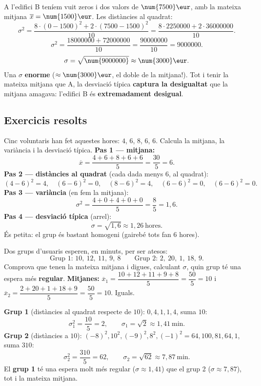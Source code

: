\begin{exemple}
A l'edifici B teníem vuit zeros i dos valors de $\num{7500}\eur$, amb la mateixa
mitjana $\overline{x}=\num{1500}\eur$. Les distàncies al quadrat:
\[
\sigma^2=\frac{8\cdot(0-\num{1500})^2+2\cdot(\num{7500}-\num{1500})^2}{10}
=\frac{8\cdot\num{2250000}+2\cdot\num{36000000}}{10}.
\]
\[
\sigma^2=\frac{\num{18000000}+\num{72000000}}{10}=\frac{\num{90000000}}{10}=\num{9000000}.
\]
\[
\sigma=\sqrt{\num{9000000}}\approx \num{3000}\eur.
\]
Una $\sigma$ \textbf{enorme} ($\approx\num{3000}\eur$, el doble de la mitjana!). Tot i
tenir la mateixa mitjana que A, la desviació típica \textbf{captura la desigualtat}
que la mitjana amagava: l'edifici B és \textbf{extremadament desigual}.
\end{exemple}

\subsection{Exercicis resolts}

\begin{exresolt}
Cinc voluntaris han fet aquestes hores: $4$, $6$, $8$, $6$, $6$. Calcula la mitjana,
la variància i la desviació típica.
\solucio
\textbf{Pas 1 — mitjana:}
\[
\overline{x}=\frac{4+6+8+6+6}{5}=\frac{30}{5}=6.
\]
\textbf{Pas 2 — distàncies al quadrat} (cada dada menys $6$, al quadrat):
\[
(4-6)^2=4,\quad (6-6)^2=0,\quad (8-6)^2=4,\quad (6-6)^2=0,\quad (6-6)^2=0.
\]
\textbf{Pas 3 — variància} (en fem la mitjana):
\[
\sigma^2=\frac{4+0+4+0+0}{5}=\frac{8}{5}=1,6.
\]
\textbf{Pas 4 — desviació típica} (arrel):
\[
\sigma=\sqrt{1,6}\approx 1,26\ \text{hores}.
\]
És petita: el grup és bastant homogeni (gairebé tots fan $6$ hores).
\end{exresolt}

\begin{exresolt}
Dos grups d'usuaris esperen, en minuts, per ser atesos:
\[
\text{Grup 1: } 10,\ 12,\ 11,\ 9,\ 8 \qquad
\text{Grup 2: } 2,\ 20,\ 1,\ 18,\ 9.
\]
Comprova que tenen la mateixa mitjana i digues, calculant $\sigma$, quin grup té una
espera més \textbf{regular}.
\solucio
\textbf{Mitjanes:} $\overline{x}_1=\dfrac{10+12+11+9+8}{5}=\dfrac{50}{5}=10$ i
$\overline{x}_2=\dfrac{2+20+1+18+9}{5}=\dfrac{50}{5}=10$. Iguals.

\textbf{Grup 1} (distàncies al quadrat respecte de $10$): $0,4,1,1,4$, suma $10$:
\[
\sigma_1^2=\frac{10}{5}=2,\qquad \sigma_1=\sqrt{2}\approx 1,41\ \text{min}.
\]
\textbf{Grup 2} (distàncies a $10$): $(-8)^2,10^2,(-9)^2,8^2,(-1)^2=64,100,81,64,1$,
suma $310$:
\[
\sigma_2^2=\frac{310}{5}=62,\qquad \sigma_2=\sqrt{62}\approx 7,87\ \text{min}.
\]
El \textbf{grup 1} té una espera molt més regular ($\sigma\approx 1,41$) que el grup
2 ($\sigma\approx 7,87$), tot i la mateixa mitjana.
\end{exresolt}

